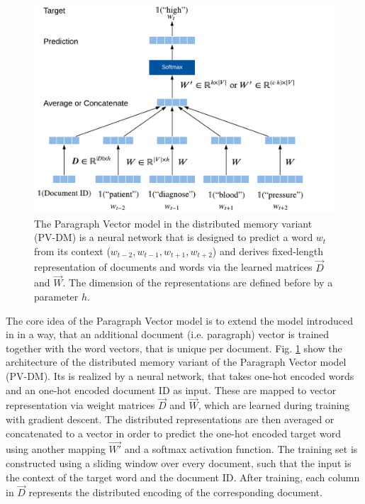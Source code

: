 \begin{figure}[!htbp]
	\centering
	\includegraphics[width=\textwidth]{figures/paragraph-vector}
	\caption[Paragraph Vector model]{The Paragraph Vector model in the distributed memory variant (PV-DM) is a neural network that is designed to predict a word $w_t$ from its context ($w_{t-2}, w_{t-1}, w_{t+1}, w_{t+2}$) and derives fixed-length representation of documents and words via the learned matrices $\vec{D}$ and $\vec{W}$. The dimension of the representations are defined before by a parameter $h$.}
	\label{fig:paragraph-vector}
\end{figure}

The core idea of the Paragraph Vector model is to extend the model introduced in \cite{DBLP:journals/jmlr/BengioDVJ03} in a way, that an additional document (i.e. paragraph) vector is trained together with the word vectors, that is unique per document.
Fig. \ref{fig:paragraph-vector} show the architecture of the distributed memory variant of the Paragraph Vector model (PV-DM).
Its is realized by a neural network, that takes one-hot encoded words and an one-hot encoded document ID as input.
These are mapped to vector representation via weight matrices $\vec{D}$ and $\vec{W}$, which are learned during training with gradient descent.
The distributed representations are then averaged or concatenated to a vector in order to predict the one-hot encoded target word using another mapping $\vec{W'}$ and a softmax activation function.
The training set is constructed using a sliding window over every document, such that the input is the context of the target word and the document ID.
After training, each column in $\vec{D}$ represents the distributed encoding of the corresponding document.

